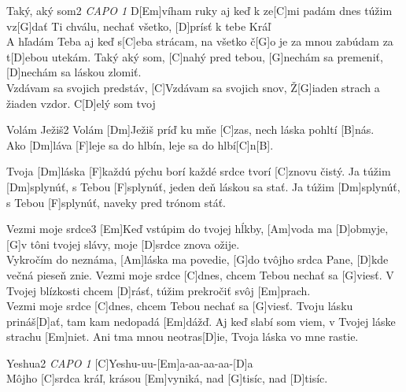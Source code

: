 \documentclass[12pt]{article}
\begin{document}
\begin{song}{Taký, aký som}{2}
\textit{\color{gray} CAPO 1}
D[Em]víham ruky aj keď k ze[C]mi padám
dnes túžim vz[G]dať Ti chválu,
nechať všetko, [D]prísť k tebe Kráľ
\\
[Em]A hľadám Teba aj keď s[C]eba strácam,
na všetko č[G]o je za mnou zabúdam
za t[D]ebou utekám.
\columnbreak
[Em]Taký aký som, 
[C]nahý pred tebou,
[G]nechám sa premeniť, 
[D]nechám sa láskou zlomiť.
\\
[Em]Vzdávam sa svojich predstáv,
[C]Vzdávam sa svojich snov,
Ž[G]iaden strach a žiaden vzdor. 
C[D]elý som tvoj
\end{song}

\begin{song}{Volám Ježiš}{2}
Volám [Dm]Ježiš príď ku mňe [C]zas,
nech láska pohltí [B]nás.
\\
Ako [Dm]láva
[F]leje sa do hlbín, 
leje sa do hlbí[C]n[B].

Tvoja [Dm]láska
[F]každú pýchu borí 
každé srdce tvorí [C]znovu čistý.
\columnbreak
Ja túžim [Dm]splynúť, s Tebou [F]splynúť,
jeden deň láskou sa stať.
Ja túžim [Dm]splynúť, s Tebou [F]splynúť,
naveky pred trónom stáť.
\end{song}

\begin{song}{Vezmi moje srdce}{3}
[Em]Keď vstúpim do tvojej hĺkby, 
[Am]voda ma [D]obmyje,
[G]v tôni tvojej slávy, 
moje [D]srdce znova ožije.
\\
[Em]Vykročím do neznáma, 
[Am]láska ma povedie,
[G]do tvôjho srdca Pane, 
[D]kde večná pieseň znie.
\columnbreak
[Em]Vezmi moje srdce [C]dnes, 
chcem Tebou nechať sa [G]viesť.
V Tvojej blízkosti chcem [D]rásť, 
túžim prekročiť svôj [Em]prach.
\\
Vezmi moje srdce [C]dnes, 
chcem Tebou nechať sa [G]viesť.
Tvoju lásku prináš[D]ať, 
tam kam nedopadá [Em]dážď.
\columnbreak
[C]Aj keď slabí som viem, 
v Tvojej láske strachu [Em]niet.
Ani tma mnou neotras[D]ie, 
Tvoja láska vo mne rastie.
\end{song}

\begin{song}{Yeshua}{2}
\textit{\color{gray} CAPO 1}
[C]Yeshu-uu-[Em]a-aa-aa-aa-[D]a
\\
Môjho [C]srdca kráľ, krásou [Em]vyniká,
nad [G]tisíc, nad [D]tisíc.
\columnbreak
\end{song}
\end{document}
